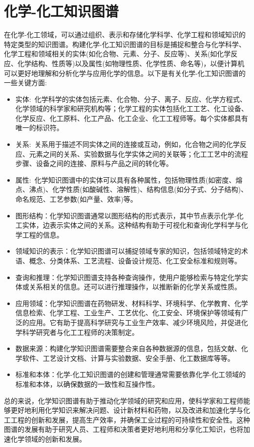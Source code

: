 \section{化学-化工知识图谱}
在化学-化工领域，可以通过组织、表示和存储化学科学、化学工程和领域知识的特定类型的知识图谱。构建化学-化工知识图谱的目标是捕捉和整合与化学科学、化学工程和领域相关的实体(如化合物、元素、分子、反应等)、关系(如化学反应、化学结构、性质等)以及属性(如物理性质、化学性质、命名等)，以便计算机可以更好地理解和分析化学与应用化学的信息。以下是有关化学-化工知识图谱的一些关键方面: 
\begin{itemize}
	\item 实体:~化学科学的实体包括元素、化合物、分子、离子、反应、化学方程式、化学领域的科学家和研究机构等；化学工程的实体包括化工工艺、化工设备、化学反应、化工原料、化工产品、化工企业、化工工程师等。每个实体都具有唯一的标识符。
	\item 关系:~关系用于描述不同实体之间的连接或互动，例如，化合物之间的化学反应、元素之间的关系、实验数据与化学实体之间的关联等；化工工艺中的流程步骤、设备之间的连接、原料与产品之间的转化等。
	\item 属性:~化学知识图谱中的实体可以具有各种属性，包括物理性质(如密度、熔点、沸点)、化学性质(如酸碱性、溶解性)、结构信息(如分子式、分子结构)、命名规范、工艺参数(如产量、效率)等。
	\item 图形结构：化学知识图谱通常以图形结构的形式表示，其中节点表示化学-化工实体，边表示实体之间的关系。这种结构有助于可视化和查询化学科学与化学工程的信息。
	\item 领域知识的表示：化学知识图谱可以捕捉领域专家的知识，包括领域特定的术语、概念、分类体系、工艺流程、设备设计规范、化工安全标准和规则等。
	\item 查询和推理：化学知识图谱支持各种查询操作，使用户能够检索与特定化学实体或关系相关的信息。还可以进行推理操作，以推断新的化学关系或性质。
	\item 应用领域：化学知识图谱在药物研发、材料科学、环境科学、化学教育、化学信息检索、化学工程、工业生产、工艺优化、化工安全、环境保护等领域有广泛的应用。它有助于提高科学研究与工业生产效率、减少环境风险，并促进化学科学研究者与化工工程师的决策制定。
	\item 数据来源：构建化学知识图谱需要整合来自各种数据源的信息，包括文献、化学软件、工艺设计文档、计算与实验数据、安全手册、化工数据库等等。
	\item 标准和本体：化学-化工知识图谱的创建和管理通常需要依靠化学-化工领域的标准和本体，以确保数据的一致性和互操作性。
\end{itemize} 
总的来说，化学知识图谱有助于推动化学领域的研究和应用，使科学家和工程师能够更好地利用化学知识来解决问题、设计新材料和药物，以及改进和加速化学与化工工程的创新和发展，提高生产效率，并确保工业过程的可持续性和安全性。这种图谱的发展有助于研究人员、工程师和决策者更好地利用和分享化工知识，也将加速化学领域的创新和发展。

